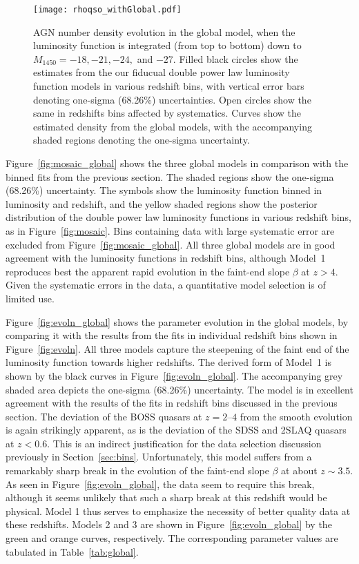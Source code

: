 \documentclass[fleqn,usenatbib]{mnras}
\newcommand{\new}[1]{{\color{notecolor} #1}}
\begin{document}
\begin{figure}
  \begin{center}
    \texttt{[image: rhoqso\_withGlobal.pdf]}
  \end{center}
  \caption{AGN number density evolution in the global model, when the
    luminosity function is integrated (from top to bottom) down to
    $M_\mathrm{1450}=-18, -21, -24,$ and $-27$.  Filled black circles
    show the estimates from the our fiducual double power law
    luminosity function models in various redshift bins, with vertical
    error bars denoting one-sigma (68.26\%) uncertainties.  Open
    circles show the same in redshifts bins affected by systematics.
    Curves show the estimated density from the global models, with the
    accompanying shaded regions denoting the one-sigma uncertainty. }
  \label{fig:rhoqso}
\end{figure}

Figure~\ref{fig:mosaic_global} shows the three global models in
comparison with the binned fits from the previous section.  The shaded
regions show the one-sigma (68.26\%) uncertainty.  The symbols show
the luminosity function binned in luminosity and redshift, and the
yellow shaded regions show the posterior distribution of the double
power law luminosity functions in various redshift bins, as in
Figure~\ref{fig:mosaic}.  Bins containing data with large systematic
error are excluded from Figure~\ref{fig:mosaic_global}.  \new{All
  three global models are in good agreement with the luminosity
  functions in redshift bins, although Model~1 reproduces best the
  apparent rapid evolution in the faint-end slope $\beta$ at $z>4$.
  Given the systematic errors in the data, a quantitative model
  selection is of limited use.}

Figure~\ref{fig:evoln_global} shows the parameter evolution in the
global models, by comparing it with the results from the fits in
individual redshift bins shown in Figure~\ref{fig:evoln}.  All three
models capture the steepening of the faint end of the luminosity
function towards higher redshifts.  The derived form of Model~1 is
shown by the black curves in Figure~\ref{fig:evoln_global}.  The
accompanying grey shaded area depicts the one-sigma (68.26\%)
uncertainty.  The model is in excellent agreement with the results of
the fits in redshift bins discussed in the previous section.
The deviation of the BOSS quasars at $z=2$--$4$ from the smooth
evolution is again strikingly apparent, as is the deviation of the
SDSS and 2SLAQ quasars at $z<0.6$.  This is an indirect justification
for the data selection discussion previously in
Section~\ref{sec:bins}.  Unfortunately, this model suffers from a
remarkably sharp break in the evolution of the faint-end slope $\beta$
at about $z\sim 3.5$.  As seen in Figure~\ref{fig:evoln_global}, the
data seem to require this break, although it seems unlikely that such
a sharp break at this redshift would be physical.  Model 1 thus serves
to emphasize the necessity of better quality data at these redshifts.
Models 2 and 3 are shown in Figure~\ref{fig:evoln_global} by the green
and orange curves, respectively.  The corresponding parameter values
are tabulated in Table~\ref{tab:global}.
\end{document}
